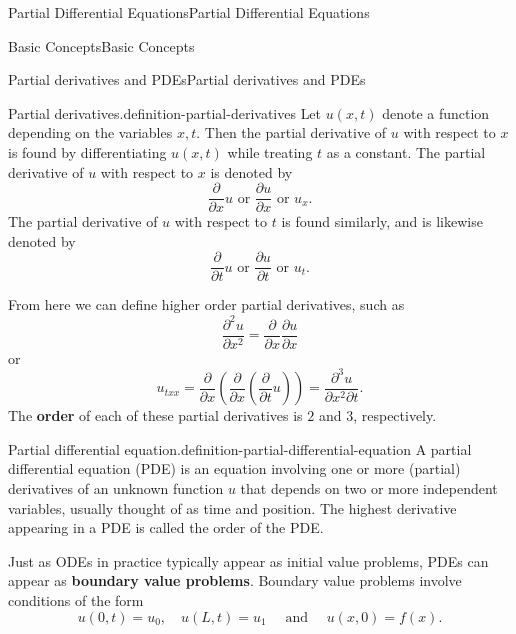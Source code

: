 \documentclass[10pt,]{book}
\newcommand{\terminology}[1]{\textbf{#1}}
\numberwithin{equation}{section}
\begin{document}
\begin{chapterptx}{Partial Differential Equations}{}{Partial Differential Equations}{}{}
\begin{sectionptx}{Basic Concepts}{}{Basic Concepts}{}{}
\begin{subsectionptx}{Partial derivatives and PDEs}{}{Partial derivatives and PDEs}{}{}
\begin{definition}{Partial derivatives.}{definition-partial-derivatives}%
\hypertarget{p-437}{}%
Let \(u(x,t)\) denote a function depending on the variables \(x,t\). Then the partial derivative of \(u\) with respect to \(x\) is found by differentiating \(u(x,t)\) while treating \(t\) as a constant. The partial derivative of \(u\) with respect to \(x\) is denoted by%
\begin{equation*}
\frac{\partial}{\partial x}u\text{ or }\frac{\partial u}{\partial x}\text{ or }u_{x}.
\end{equation*}
The partial derivative of \(u\) with respect to \(t\) is found similarly, and is likewise denoted by%
\begin{equation*}
\frac{\partial}{\partial t}u\text{ or }\frac{\partial u}{\partial t}\text{ or }u_{t}.
\end{equation*}
%
\end{definition}
\hypertarget{p-438}{}%
From here we can define higher order partial derivatives, such as%
\begin{equation*}
\frac{\partial^{2}u}{\partial x^{2}} = \frac{\partial}{\partial x}\frac{\partial u}{\partial x}
\end{equation*}
or%
\begin{equation*}
u_{txx} = \frac{\partial}{\partial x}\left(\frac{\partial}{\partial x}\left(\frac{\partial}{\partial t}u\right)\right) = \frac{\partial^{3}u}{\partial x^{2}\partial t}.
\end{equation*}
The \terminology{order} of each of these partial derivatives is \(2\) and \(3\), respectively.%
\begin{definition}{Partial differential equation.}{definition-partial-differential-equation}%
\hypertarget{p-439}{}%
A partial differential equation (PDE) is an equation involving one or more (partial) derivatives of an unknown function \(u\) that depends on two or more independent variables, usually thought of as time and position. The highest derivative appearing in a PDE is called the order of the PDE.%
\end{definition}
\hypertarget{p-440}{}%
Just as ODEs in practice typically appear as initial value problems, PDEs can appear as \terminology{boundary value problems}. Boundary value problems involve conditions of the form%
\begin{equation*}
u(0,t) = u_{0},\quad u(L,t) = u_{1} \quad \text{ and }\quad u(x,0) = f(x).
\end{equation*}

\end{subsectionptx}
\end{sectionptx}
\end{chapterptx}
\end{document}
